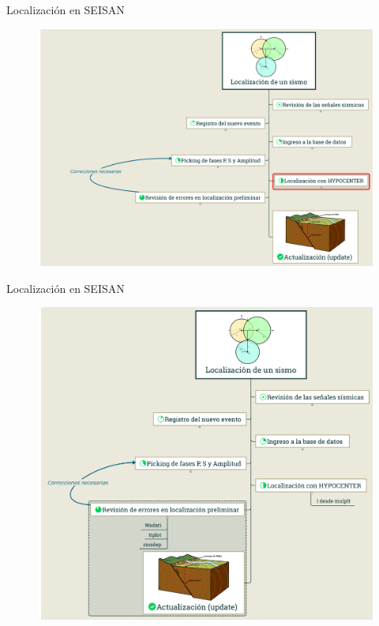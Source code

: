 \documentclass[11pt]{beamer}
\begin{document}
\begin{frame}{Localización en SEISAN}
\begin{figure}
\includegraphics[scale=0.15]{localizacion_1_5.png}
\end{figure}
\end{frame}

\begin{frame}{Localización en SEISAN}
\begin{figure}
\includegraphics[scale=0.13]{localizacion_6.png}
\end{figure}
\end{frame}
\end{document}
